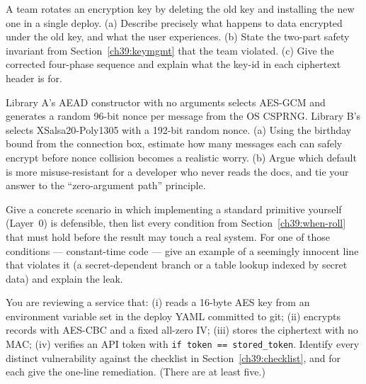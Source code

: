 \begin{exercise}
A team rotates an encryption key by deleting the old key and installing the new one
in a single deploy. (a) Describe precisely what happens to data encrypted under the
old key, and what the user experiences. (b) State the two-part safety invariant
from Section~\ref{ch39:keymgmt} that the team violated. (c) Give the corrected
four-phase sequence and explain what the key-id in each ciphertext header is for.
\end{exercise}

\begin{exercise}
Library A's AEAD constructor with no arguments selects AES-GCM and generates a
random 96-bit nonce per message from the OS CSPRNG. Library B's selects
XSalsa20-Poly1305 with a 192-bit random nonce. (a) Using the birthday bound from
the connection box, estimate how many messages each can safely encrypt before nonce
collision becomes a realistic worry. (b) Argue which default is more
misuse-resistant for a developer who never reads the docs, and tie your answer to
the ``zero-argument path'' principle.
\end{exercise}

\begin{exercise}
Give a concrete scenario in which implementing a standard primitive yourself
(Layer~0) is defensible, then list every condition from Section~\ref{ch39:when-roll}
that must hold before the result may touch a real system. For one of those
conditions --- constant-time code --- give an example of a seemingly innocent line
that violates it (a secret-dependent branch or a table lookup indexed by secret
data) and explain the leak.
\end{exercise}

\begin{exercise}
You are reviewing a service that: (i) reads a 16-byte AES key from an environment
variable set in the deploy YAML committed to git; (ii) encrypts records with
AES-CBC and a fixed all-zero IV; (iii) stores the ciphertext with no MAC; (iv)
verifies an API token with \texttt{if token == stored\_token}. Identify every
distinct vulnerability against the checklist in Section~\ref{ch39:checklist}, and
for each give the one-line remediation. (There are at least five.)
\end{exercise}
